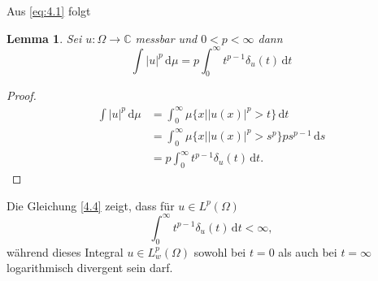 \documentclass[
paper=a4,
bibtotocnumbered,
liststotocnumbered,
tablecaptionabove,
pointlessnumbers,
twoside,
openright,
10pt
]
{report}
\newtheorem{lem}[thm]{Lemma}
\theoremstyle{definition}
\numberwithin{equation}{chapter}
\begin{document}
Aus \eqref{eq:4.1} folgt
\begin{lem}\label{4.5}
Sei $u: \Omega \to \mathbb C$ messbar und $0<p<\infty$ dann
\begin{equation}\label{eq:4.4}
\int |u|^p \, \mathrm d\mu = p \int_0^\infty t^{p-1} \delta_u(t) \, \mathrm dt
\end{equation}
\end{lem}
\begin{proof}
\begin{align*}
\int |u|^p \, \mathrm d\mu &= \int_0^\infty \mu\{ x| |u(x)|^p >t\} \, \mathrm dt \\
&= \int_0^\infty \mu\{ x| |u(x)|^p > s^p\} ps^{p-1} \,\mathrm ds\\
&= p \int_0^\infty t^{p-1} \delta_u(t) \, \mathrm dt.
\end{align*}
\end{proof}
Die Gleichung \eqref{4.4} zeigt, dass für $u\in L^p(\Omega)$
\begin{equation}
\int_0^\infty t^{p-1} \delta_u(t) \, \mathrm dt <\infty,
\end{equation}
während dieses Integral $u\in L^p_w(\Omega)$ sowohl bei $t=0$ als auch bei $t=\infty$ logarithmisch divergent sein darf.
\end{document}
